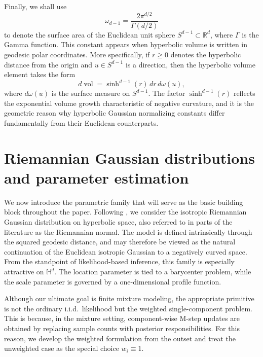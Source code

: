 \documentclass[11pt]{article}
\begin{document}
Finally, we shall use
\begin{equation}\label{eq:bg_omega}
\omega_{d-1}
=
\frac{2\pi^{d/2}}{\Gamma(d/2)}
\end{equation}
to denote the surface area of the Euclidean unit sphere \(S^{d-1}\subset\mathbb{R}^d\), where \(\Gamma\) is the Gamma function. This constant appears when hyperbolic volume is written in geodesic polar coordinates. More specifically, if \(r\ge 0\) denotes the hyperbolic distance from the origin and \(u\in S^{d-1}\) is a direction, then the hyperbolic volume element takes the form
\begin{equation}\label{eq:bg_volume_element}
d\operatorname{vol}
=
\sinh^{d-1}(r)\,dr\,d\omega(u),
\end{equation}
where \(d\omega(u)\) is the surface measure on \(S^{d-1}\). The factor \(\sinh^{d-1}(r)\) reflects the exponential volume growth characteristic of negative curvature, and it is the geometric reason why hyperbolic Gaussian normalizing constants differ fundamentally from their Euclidean counterparts.

\section{Riemannian Gaussian distributions and parameter estimation}\label{sec:model}

We now introduce the parametric family that will serve as the basic building block throughout the paper. Following \cite{said_2018_GaussianDistributionsRiemannian}, we consider the isotropic {Riemannian Gaussian distribution} on hyperbolic space, also referred to in parts of the literature as the {Riemannian normal}. The model is defined intrinsically through the squared geodesic distance, and may therefore be viewed as the natural continuation of the Euclidean isotropic Gaussian to a negatively curved space. From the standpoint of likelihood-based inference, this family is especially attractive on \(\mathbb{H}^d\). The location parameter is tied to a barycenter problem, while the scale parameter is governed by a one-dimensional profile function.

Although our ultimate goal is finite mixture modeling, the appropriate primitive is not the ordinary i.i.d.\ likelihood but the weighted single-component problem. This is because, in the mixture setting, component-wise M-step updates are obtained by replacing sample counts with posterior responsibilities. For this reason, we develop the weighted formulation from the outset and treat the unweighted case as the special choice \(w_i\equiv 1\).
\end{document}
